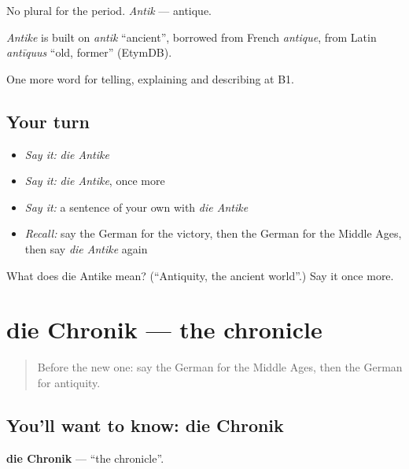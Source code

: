 No plural for the period. \emph{Antik} — antique.

\begin{cousinweb}
\emph{Antike} is built on \emph{antik} \textquotedblleft{}ancient\textquotedblright{}, borrowed from French \emph{antique}, from Latin \emph{antīquus} \textquotedblleft{}old, former\textquotedblright{} (EtymDB).
\end{cousinweb}

\begin{grammarlens}[title={What you've built}]
One more word for telling, explaining and describing at B1.
\end{grammarlens}

\subsection*{Your turn}
\begin{itemize}
\raggedright
  \item \emph{Say it:} \emph{die Antike}
  \item \emph{Say it:} \emph{die Antike}, once more
  \item \emph{Say it:} a sentence of your own with \emph{die Antike}
  \item \emph{Recall:} say the German for the victory, then the German for the Middle Ages, then say \emph{die Antike} again
\end{itemize}

\begin{tcolorbox}[breakable,colback=teal!4,colframe=teal!35!black,title={Before you move on}]
What does die Antike mean? (\textquotedblleft{}Antiquity, the ancient world\textquotedblright{}.) Say it once more.
\end{tcolorbox}
\section[die Chronik]{die Chronik — the chronicle}

\label{lesson:GE-C320-chronik}



\begin{quote}
Before the new one: say the German for the Middle Ages, then the German for antiquity.
\end{quote}

\subsection*{You'll want to know: die Chronik}
\textbf{die Chronik} — \textquotedblleft{}the chronicle\textquotedblright{}.


